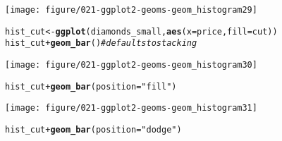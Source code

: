\documentclass[a4paper,titlepage]{tufte-handout}\usepackage[]{graphicx}\usepackage[]{color}
\makeatletter
\def\maxwidth{ %
  \ifdim\Gin@nat@width>\linewidth
    \linewidth
  \else
    \Gin@nat@width
  \fi
}
\newcommand{\hlstr}[1]{\textcolor[rgb]{0.192,0.494,0.8}{#1}}%
\newcommand{\hlcom}[1]{\textcolor[rgb]{0.678,0.584,0.686}{\textit{#1}}}%
\newcommand{\hlopt}[1]{\textcolor[rgb]{0,0,0}{#1}}%
\newcommand{\hlstd}[1]{\textcolor[rgb]{0.345,0.345,0.345}{#1}}%
\newcommand{\hlkwb}[1]{\textcolor[rgb]{0.69,0.353,0.396}{#1}}%
\newcommand{\hlkwc}[1]{\textcolor[rgb]{0.333,0.667,0.333}{#1}}%
\newcommand{\hlkwd}[1]{\textcolor[rgb]{0.737,0.353,0.396}{\textbf{#1}}}%
\newenvironment{kframe}{%
 \def\at@end@of@kframe{}%
 \ifinner\ifhmode%
  \def\at@end@of@kframe{\end{minipage}}%
  \begin{minipage}{\columnwidth}%
 \fi\fi%
 \def\FrameCommand##1{\hskip\@totalleftmargin \hskip-\fboxsep
 \colorbox{shadecolor}{##1}\hskip-\fboxsep
     \hskip-\linewidth \hskip-\@totalleftmargin \hskip\columnwidth}%
 \MakeFramed {\advance\hsize-\width
   \@totalleftmargin\z@ \linewidth\hsize
   \@setminipage}}%
 {\par\unskip\endMakeFramed%
 \at@end@of@kframe}
\newenvironment{knitrout}{}{} %
\makeatother
\begin{document}
\begin{knitrout}
\begin{kframe}
{\ttfamily\noindent\itshape\color{messagecolor}{\#\# stat\_bin: binwidth defaulted to range/30. Use 'binwidth = x' to adjust this.}}\end{kframe}
\texttt{[image: figure/021-ggplot2-geoms-geom\_histogram29]} 
\begin{kframe}\begin{alltt}
\hlstd{hist_cut} \hlkwb{<-} \hlkwd{ggplot}\hlstd{(diamonds_small,} \hlkwd{aes}\hlstd{(}\hlkwc{x}\hlstd{=price,} \hlkwc{fill}\hlstd{=cut))}
\hlstd{hist_cut} \hlopt{+} \hlkwd{geom_bar}\hlstd{()} \hlcom{# defaults to stacking}
\end{alltt}


{\ttfamily\noindent\itshape\color{messagecolor}{\#\# stat\_bin: binwidth defaulted to range/30. Use 'binwidth = x' to adjust this.}}\end{kframe}
\texttt{[image: figure/021-ggplot2-geoms-geom\_histogram30]} 
\begin{kframe}\begin{alltt}
\hlstd{hist_cut} \hlopt{+} \hlkwd{geom_bar}\hlstd{(}\hlkwc{position}\hlstd{=}\hlstr{"fill"}\hlstd{)}
\end{alltt}


{\ttfamily\noindent\itshape\color{messagecolor}{\#\# stat\_bin: binwidth defaulted to range/30. Use 'binwidth = x' to adjust this.}}\end{kframe}
\texttt{[image: figure/021-ggplot2-geoms-geom\_histogram31]} 
\begin{kframe}\begin{alltt}
\hlstd{hist_cut} \hlopt{+} \hlkwd{geom_bar}\hlstd{(}\hlkwc{position}\hlstd{=}\hlstr{"dodge"}\hlstd{)}
\end{alltt}



\end{kframe}
\end{knitrout}
\end{document}
